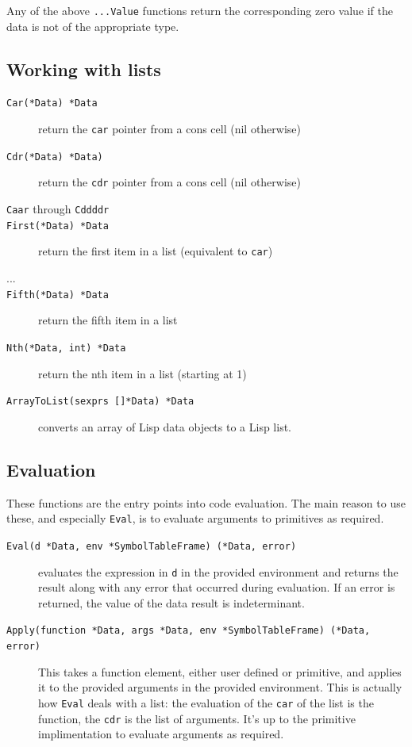 \documentclass[12pt]{article}
\begin{document}
\noindent Any of the above \verb|...Value| functions return the
corresponding zero value if the data is
not of the appropriate type.

\subsection{Working with lists}

\begin{description}
\item [{\tt Car(*Data) *Data}] return the \verb|car| pointer from a cons
  cell (nil otherwise)
\item [{\tt Cdr(*Data) *Data)}] return the \verb|cdr| pointer from a cons
  cell (nil otherwise)
\item [{\tt Caar} through {\tt Cddddr}]
\item [{\tt First(*Data) *Data}] return the first item in a list
  (equivalent to \verb|car|)
\item [...]
\item [{\tt Fifth(*Data) *Data}] return the fifth item in a list
\item [{\tt Nth(*Data, int) *Data}] return the nth item in a list
  (starting at 1)
\item [{\tt ArrayToList(sexprs []*Data) *Data}] converts an array of
  Lisp data objects to a Lisp list.
\end{description}

\subsection{Evaluation}

These functions are the entry points into code evaluation. The main
reason to use these, and especially \verb|Eval|, is to evaluate
arguments to primitives as required.

\begin{description}
\item [{\tt Eval(d *Data, env *SymbolTableFrame) (*Data, error)}] evaluates the expression in \verb|d| in the provided
  environment and returns the result along with any error that
  occurred during evaluation. If an error is returned, the value of
  the data result is indeterminant.
\item [{\tt Apply(function *Data, args *Data, env *SymbolTableFrame)
    (*Data, error)}] This takes a function element, either
  user defined or primitive, and applies it to the provided arguments
  in the provided environment. This is actually how \verb|Eval| deals
  with a list: the evaluation of the \verb|car| of the list is the
  function, the \verb|cdr| is the list of arguments. It's up to the
  primitive implimentation to evaluate arguments as required.
\end{description}
\end{document}
